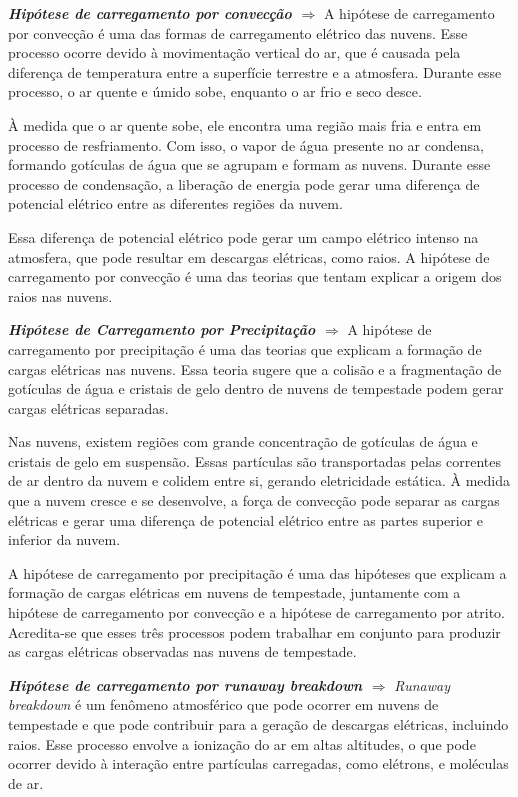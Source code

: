 \documentclass[a4paper, 12pt, onecolumn,singlespacing]{article}
\begin{document}
\begin{itemize}
		\subitem \textbf{\textit{Hipótese de carregamento por convecção $\Rightarrow$}} A hipótese de carregamento por convecção é uma das formas de carregamento elétrico das nuvens. Esse processo ocorre devido à movimentação vertical do ar, que é causada pela diferença de temperatura entre a superfície terrestre e a atmosfera. Durante esse processo, o ar quente e úmido sobe, enquanto o ar frio e seco desce.
		
		À medida que o ar quente sobe, ele encontra uma região mais fria e entra em processo de resfriamento. Com isso, o vapor de água presente no ar condensa, formando gotículas de água que se agrupam e formam as nuvens. Durante esse processo de condensação, a liberação de energia pode gerar uma diferença de potencial elétrico entre as diferentes regiões da nuvem.
		
		Essa diferença de potencial elétrico pode gerar um campo elétrico intenso na atmosfera, que pode resultar em descargas elétricas, como raios. A hipótese de carregamento por convecção é uma das teorias que tentam explicar a origem dos raios nas nuvens.
		
		\subitem \textbf{\textit{Hipótese de Carregamento por Precipitação $\Rightarrow$ }}A hipótese de carregamento por precipitação é uma das teorias que explicam a formação de cargas elétricas nas nuvens. Essa teoria sugere que a colisão e a fragmentação de gotículas de água e cristais de gelo dentro de nuvens de tempestade podem gerar cargas elétricas separadas.
		
		Nas nuvens, existem regiões com grande concentração de gotículas de água e cristais de gelo em suspensão. Essas partículas são transportadas pelas correntes de ar dentro da nuvem e colidem entre si, gerando eletricidade estática. À medida que a nuvem cresce e se desenvolve, a força de convecção pode separar as cargas elétricas e gerar uma diferença de potencial elétrico entre as partes superior e inferior da nuvem.
		
		A hipótese de carregamento por precipitação é uma das hipóteses que explicam a formação de cargas elétricas em nuvens de tempestade, juntamente com a hipótese de carregamento por convecção e a hipótese de carregamento por atrito. Acredita-se que esses três processos podem trabalhar em conjunto para produzir as cargas elétricas observadas nas nuvens de tempestade.
		
		\subitem \textbf{\textit{Hipótese de carregamento por runaway breakdown $\Rightarrow$ }}\textit{Runaway breakdown} é um fenômeno atmosférico que pode ocorrer em nuvens de tempestade e que pode contribuir para a geração de descargas elétricas, incluindo raios. Esse processo envolve a ionização do ar em altas altitudes, o que pode ocorrer devido à interação entre partículas carregadas, como elétrons, e moléculas de ar.
		

\end{itemize}
\end{document}

